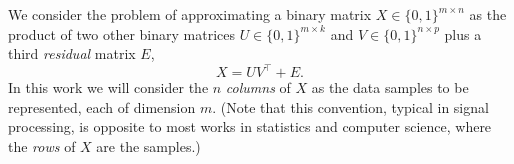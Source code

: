 \documentclass[twocolumn]{IEEEtran}
\theoremstyle{definition}
\def\transp{^\intercal}
\newcommand{\refeq}[1]{(\ref{#1})}
\begin{document}
We consider the problem of approximating a binary matrix $X \in \{0,1\}^{m{\times}n}$ as the product of two other binary matrices $U \in \{0,1\}^{m{\times}k}$ and $V \in \{0,1\}^{n{\times}p}$ plus a third \emph{residual} matrix $E$,
\begin{equation}
X = UV\transp + E.
\label{eq:mf}
\end{equation}
In this work we will consider the $n$ \emph{columns} of $X$ as the data samples to be represented, each of dimension $m$. (Note that this convention, typical in signal processing, is opposite to most works in statistics and computer science, where the \emph{rows} of $X$ are the samples.)
%
\end{document}
